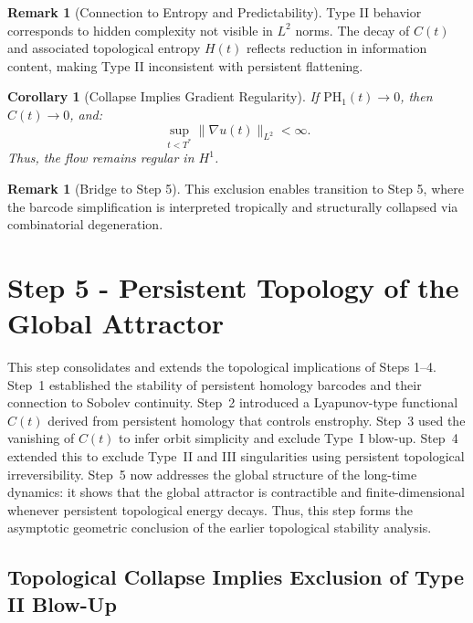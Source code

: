 \documentclass[11pt]{article}
\newtheorem{corollary}[theorem]{Corollary}
\theoremstyle{definition}
\newtheorem{remark}[theorem]{Remark}
\begin{document}
\begin{remark}[Connection to Entropy and Predictability]
Type II behavior corresponds to hidden complexity not visible in $L^2$ norms. The decay of $C(t)$ and associated topological entropy $H(t)$ reflects reduction in information content, making Type II inconsistent with persistent flattening.
\end{remark}

\begin{corollary}[Collapse Implies Gradient Regularity]
If $\mathrm{PH}_1(t) \to 0$, then $C(t) \to 0$, and:
\[
\sup_{t < T^*} \|\nabla u(t)\|_{L^2} < \infty.
\]
Thus, the flow remains regular in $H^1$.
\end{corollary}

\begin{remark}[Bridge to Step 5]
This exclusion enables transition to Step 5, where the barcode simplification is interpreted tropically and structurally collapsed via combinatorial degeneration.
\end{remark}

\section{Step 5 - Persistent Topology of the Global Attractor}
\label{sec:step5}

This step consolidates and extends the topological implications of Steps 1--4. Step~1 established the stability of persistent homology barcodes and their connection to Sobolev continuity. Step~2 introduced a Lyapunov-type functional $C(t)$ derived from persistent homology that controls enstrophy. Step~3 used the vanishing of $C(t)$ to infer orbit simplicity and exclude Type~I blow-up. Step~4 extended this to exclude Type~II and III singularities using persistent topological irreversibility. Step~5 now addresses the global structure of the long-time dynamics: it shows that the global attractor is contractible and finite-dimensional whenever persistent topological energy decays. Thus, this step forms the asymptotic geometric conclusion of the earlier topological stability analysis.

\subsection{Topological Collapse Implies Exclusion of Type II Blow-Up}
\end{document}
